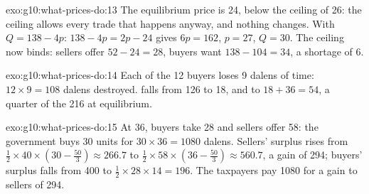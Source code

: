 \begin{solution}{exo:g10:what-prices-do:13}
The equilibrium price is 24, below the ceiling of 26: the ceiling allows every trade that happens anyway, and nothing changes. With $Q = 138 - 4p$: $138 - 4p = 2p - 24$ gives $6p =
162$, $p = 27$, $Q = 30$. The ceiling now binds: sellers offer $52 - 24 = 28$, buyers want $138 - 104 = 34$, a shortage of 6.
\end{solution}

\begin{solution}{exo:g10:what-prices-do:14}
Each of the 12 buyers loses 9 dalens of time: $12 \times 9 = 108$ dalens destroyed.  falls from 126 to 18, and  to $18 + 36 = 54$, a quarter of the
216 at equilibrium.
\end{solution}

\begin{solution}{exo:g10:what-prices-do:15}
At 36, buyers take 28 and sellers offer 58: the government buys 30 units for $30 \times 36 = 1080$ dalens. Sellers' surplus rises from $\tfrac12 \times 40 \times (30 - \tfrac{50}{3})
\approx 266.7$ to $\tfrac12 \times 58 \times (36 - \tfrac{50}{3}) \approx 560.7$, a gain of 294; buyers' surplus falls from 400 to $\tfrac12 \times 28 \times 14 = 196$. The taxpayers
pay 1080 for a gain to sellers of 294.
\end{solution}

